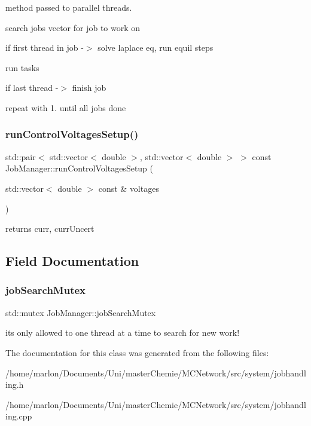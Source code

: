 method passed to parallel threads.
\begin{DoxyEnumerate}
\item search jobs vector for job to work on
\item if first thread in job -\/$>$ solve laplace eq, run equil steps
\item run tasks
\item if last thread -\/$>$ finish job
\item repeat with 1. until all jobs done 
\end{DoxyEnumerate}\mbox{\label{classJobManager_af1a851cbf0d447aa2248a2d89b544e9d}} 
\subsubsection{\texorpdfstring{run\+Control\+Voltages\+Setup()}{runControlVoltagesSetup()}}
{\footnotesize\ttfamily std\+::pair$<$ std\+::vector$<$ double $>$, std\+::vector$<$ double $>$ $>$ const Job\+Manager\+::run\+Control\+Voltages\+Setup (\begin{DoxyParamCaption}\item[{std\+::vector$<$ double $>$ const \&}]{voltages }\end{DoxyParamCaption})}

returns curr, curr\+Uncert 

\subsection{Field Documentation}
\mbox{\label{classJobManager_af64a4f6d4843c3d5ca12c801c25666ac}} 
\subsubsection{\texorpdfstring{job\+Search\+Mutex}{jobSearchMutex}}
{\footnotesize\ttfamily std\+::mutex Job\+Manager\+::job\+Search\+Mutex\hspace{0.3cm}{\ttfamily [private]}}

its only allowed to one thread at a time to search for new work! 

The documentation for this class was generated from the following files\+:\begin{DoxyCompactItemize}
\item 
/home/marlon/\+Documents/\+Uni/master\+Chemie/\+M\+C\+Network/src/system/jobhandling.\+h\item 
/home/marlon/\+Documents/\+Uni/master\+Chemie/\+M\+C\+Network/src/system/jobhandling.\+cpp\end{DoxyCompactItemize}
